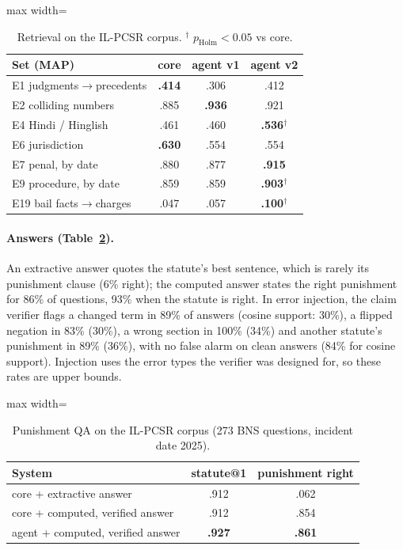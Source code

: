 \documentclass[11pt]{article}
\begin{document}
\begin{table}[t]
\centering\small
\begin{adjustbox}{max width=\linewidth}
\begin{tabular}{lccc}
\toprule
Set (MAP) & core & agent v1 & agent v2 \\
\midrule
E1 judgments$\rightarrow$precedents & \textbf{.414} & .306 & .412 \\
E2 colliding numbers & .885 & \textbf{.936} & .921 \\
E4 Hindi / Hinglish & .461 & .460 & \textbf{.536}$^\dagger$ \\
E6 jurisdiction & \textbf{.630} & .554 & .554 \\
E7 penal, by date & .880 & .877 & \textbf{.915} \\
E9 procedure, by date & .859 & .859 & \textbf{.903}$^\dagger$ \\
E19 bail facts$\rightarrow$charges & .047 & .057 & \textbf{.100}$^\dagger$ \\
\bottomrule
\end{tabular}
\end{adjustbox}
\caption{Retrieval on the IL-PCSR corpus. $^\dagger$ $p_{\text{Holm}}<0.05$ vs core.}
\label{tab:retrieval}
\end{table}

\paragraph{Answers (Table~\ref{tab:answers}).} An extractive answer quotes the statute's best
sentence, which is rarely its punishment clause (6\% right); the computed answer states the right
punishment for 86\% of questions, 93\% when the statute is right. In error injection, the claim
verifier flags a changed term in 89\% of answers (cosine support: 30\%), a flipped negation in 83\%
(30\%), a wrong section in 100\% (34\%) and another statute's punishment in 89\% (36\%), with no
false alarm on clean answers (84\% for cosine support). Injection uses the error types the verifier
was designed for, so these rates are upper bounds.

\begin{table}[t]
\centering\small
\begin{adjustbox}{max width=\linewidth}
\begin{tabular}{lcc}
\toprule
System & statute@1 & punishment right \\
\midrule
core + extractive answer & .912 & .062 \\
core + computed, verified answer & .912 & .854 \\
agent + computed, verified answer & \textbf{.927} & \textbf{.861} \\
\bottomrule
\end{tabular}
\end{adjustbox}
\caption{Punishment QA on the IL-PCSR corpus (273 BNS questions, incident date 2025).}
\label{tab:answers}
\end{table}
\end{document}
